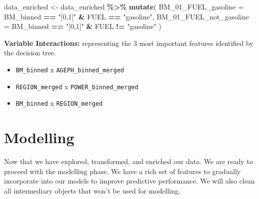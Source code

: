 \documentclass[
  english,
  11pt,
]{article}
\newenvironment{Shaded}{\begin{snugshade}}{\end{snugshade}}
\newcommand{\AttributeTok}[1]{\textcolor[rgb]{0.13,0.29,0.53}{#1}}
\newcommand{\FunctionTok}[1]{\textcolor[rgb]{0.13,0.29,0.53}{\textbf{#1}}}
\newcommand{\NormalTok}[1]{#1}
\newcommand{\OtherTok}[1]{\textcolor[rgb]{0.56,0.35,0.01}{#1}}
\newcommand{\SpecialCharTok}[1]{\textcolor[rgb]{0.81,0.36,0.00}{\textbf{#1}}}
\newcommand{\StringTok}[1]{\textcolor[rgb]{0.31,0.60,0.02}{#1}}
\providecommand{\tightlist}{%
  \setlength{\itemsep}{0pt}\setlength{\parskip}{0pt}}
\begin{document}
\begin{Shaded}
\begin{Highlighting}[]
\NormalTok{data\_enriched }\OtherTok{\textless{}{-}}\NormalTok{ data\_enriched }\SpecialCharTok{\%\textgreater{}\%}
    \FunctionTok{mutate}\NormalTok{(}
        \AttributeTok{BM\_01\_FUEL\_gasoline =}\NormalTok{ BM\_binned }\SpecialCharTok{==} \StringTok{"[0,1]"} \SpecialCharTok{\&}\NormalTok{ FUEL }\SpecialCharTok{==} \StringTok{"gasoline"}\NormalTok{,}
        \AttributeTok{BM\_01\_FUEL\_not\_gasoline =}\NormalTok{ BM\_binned }\SpecialCharTok{==} \StringTok{"[0,1]"} \SpecialCharTok{\&}\NormalTok{ FUEL }\SpecialCharTok{!=} \StringTok{"gasoline"}
\NormalTok{    )}
\end{Highlighting}
\end{Shaded}

\textbf{Variable Interactions:} representing the 3 most important
features identified by the decision tree.

\begin{itemize}
\tightlist
\item
  \texttt{BM\_binned} x \texttt{AGEPH\_binned\_merged}
\item
  \texttt{REGION\_merged} x \texttt{POWER\_binned\_merged}
\item
  \texttt{BM\_binned} x \texttt{REGION\_merged}
\end{itemize}

\section{Modelling}\label{modelling}

Now that we have explored, transformed, and enriched our data. We are
ready to proceed with the modelling phase. We have a rich set of
features to gradually incorporate into our models to improve predictive
performance. We will also clean all intermediary objects that won't be
used for modelling.
\end{document}
